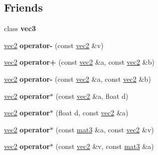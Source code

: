\subsection*{Friends}
\begin{DoxyCompactItemize}
\item 
\hypertarget{classvec2_aa849243c6cd858bbcd88237a8ad16cad}{class {\bfseries vec3}}\label{classvec2_aa849243c6cd858bbcd88237a8ad16cad}

\item 
\hypertarget{classvec2_a4a372204e9d4fbce7b21ba855dc5e567}{\hyperlink{classvec2}{vec2} {\bfseries operator-\/} (const \hyperlink{classvec2}{vec2} \&v)}\label{classvec2_a4a372204e9d4fbce7b21ba855dc5e567}

\item 
\hypertarget{classvec2_af88e7bfe4941c172e739b2ed12dc3dbf}{\hyperlink{classvec2}{vec2} {\bfseries operator+} (const \hyperlink{classvec2}{vec2} \&a, const \hyperlink{classvec2}{vec2} \&b)}\label{classvec2_af88e7bfe4941c172e739b2ed12dc3dbf}

\item 
\hypertarget{classvec2_a38bfd1f3fcf7ccb830294f81494c31f5}{\hyperlink{classvec2}{vec2} {\bfseries operator-\/} (const \hyperlink{classvec2}{vec2} \&a, const \hyperlink{classvec2}{vec2} \&b)}\label{classvec2_a38bfd1f3fcf7ccb830294f81494c31f5}

\item 
\hypertarget{classvec2_a50d01da54821c995f9aded76a906ca89}{\hyperlink{classvec2}{vec2} {\bfseries operator$\ast$} (const \hyperlink{classvec2}{vec2} \&a, float d)}\label{classvec2_a50d01da54821c995f9aded76a906ca89}

\item 
\hypertarget{classvec2_ae2a81e4b82f1bb997eead78e896d9776}{\hyperlink{classvec2}{vec2} {\bfseries operator$\ast$} (float d, const \hyperlink{classvec2}{vec2} \&a)}\label{classvec2_ae2a81e4b82f1bb997eead78e896d9776}

\item 
\hypertarget{classvec2_a307ae299187b6d9e75b1a7730b6213c2}{\hyperlink{classvec2}{vec2} {\bfseries operator$\ast$} (const \hyperlink{classmat3}{mat3} \&a, const \hyperlink{classvec2}{vec2} \&v)}\label{classvec2_a307ae299187b6d9e75b1a7730b6213c2}

\item 
\hypertarget{classvec2_a291441f8875ed2cfe2ef1c6beadd87ca}{\hyperlink{classvec2}{vec2} {\bfseries operator$\ast$} (const \hyperlink{classvec2}{vec2} \&v, const \hyperlink{classmat3}{mat3} \&a)}\label{classvec2_a291441f8875ed2cfe2ef1c6beadd87ca}


\end{DoxyCompactItemize}
